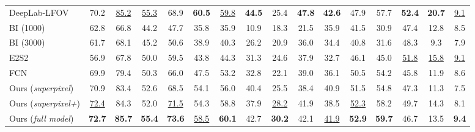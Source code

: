 \begin{table*}[t!]
\begin{center}
\begin{tabular}{lccccccccccccccc}
      DeepLab-LFOV \cite{chen2016deeplab}      & 70.2  & \underline{85.2}  & \underline{55.3}  & 68.9  & \textbf{60.5}  & \underline{59.8}  & \textbf{44.5}  & 25.4  & \textbf{47.8}  & \textbf{42.6}  & 47.9  & 57.7  & \textbf{52.4}  & \textbf{20.7}  & \underline{9.1}  \\
      BI (1000)  \cite{raghudeep2015spCNN}      &  62.8  &  66.8  &  44.2  &  47.7  &  35.8  &  35.9  &  10.9  & 18.3   &  21.5  &  35.9  & 41.5   & 30.9   & 47.4   & 12.8 & 8.5  \\
      BI (3000) \cite{raghudeep2015spCNN}      &  61.7  &  68.1  &  45.2  &  50.6  &  38.9  &  40.3  &  26.2  & 20.9   &  36.0  &  34.4  & 40.8   & 31.6   & 48.3   & 9.3 & 7.9  \\
      E2S2  \cite{region_end2end2016eccv}  &  56.9  & 67.8   & 50.0  & 59.5  &  43.8  &   44.3  &  31.3  & 24.6   &  37.9  &  32.7  &  46.1 & 45.0  & \underline{51.8}   &  \underline{15.8}  &  \underline{9.1} \\
      FCN \cite{long2015fully}  & 69.9  & 79.4  & 50.3  & 66.0  & 47.5  & 53.2  & 32.8  & 22.1  & 39.0  & 36.1  & 50.5  & 54.2  & 45.8  & 11.9  & 8.6  \\
      \cmidrule(lr){1-1}\cmidrule(lr){2-16}
      Ours (\textit{superpixel}) & 70.9  & 83.4  & 52.6  & 68.5  & 54.1  & 56.0  & 40.4  & 25.5  & 38.4  & 40.9  & 51.5  & 54.8  & 47.3  & 11.3  & 7.5  \\
      Ours (\textit{superpixel+}) & \underline{72.4}  & {84.3}  & {52.0}  & \underline{71.5}  & {54.3}  & {58.8}  & {37.9}  & \underline{28.2}  & {41.9}  & {38.5}  & \underline{52.3}  & {58.2}  & {49.7}  & {14.3}  & 8.1  \\
      Ours (\textit{full model}) & \textbf{72.7}  & \textbf{85.7}  & \textbf{55.4}  & \textbf{73.6}  & \underline{58.5}  & \textbf{60.1}  & {42.7}  & \textbf{30.2}  & {42.1}  & \underline{41.9}  & \textbf{52.9}  & \textbf{59.7}  & 46.7  & {13.5}  & \textbf{9.4}  \\
     \hline
    \end{tabular}
    

\end{center}
\end{table*}
